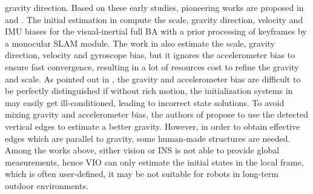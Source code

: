 \documentclass[journal,article,submit,moreauthors,pdftex]{Definitions/mdpi}
\begin{document}
gravity direction. Based on these early studies, pioneering works are proposed in \cite{mur-artalVisualInertialMonocularSLAM2017a} and \cite{qinRobustInitializationMonocular2017}. The initial estimation in \cite{mur-artalVisualInertialMonocularSLAM2017a} compute the scale, gravity direction, velocity and IMU biases for the visual-inertial full BA with a prior processing of keyframes by a monocular SLAM module. The work in \cite{qinRobustInitializationMonocular2017} also estimate the scale, gravity direction, velocity and gyroscope bias, but it ignores the accelerometer bias to ensure fast convergence, resulting in a lot of resources cost to refine the gravity and scale. As pointed out in \cite{martinelliClosedFormSolutionVisualInertial2014}, the gravity and accelerometer bias are difficult to be perfectly distinguished if without rich motion, the initialization systems in \cite{mur-artalVisualInertialMonocularSLAM2017a,qinRobustInitializationMonocular2017} may easily get ill-conditioned, leading to incorrect state solutions. To avoid mixing gravity and accelerometer bias, the authors of \cite{liRapidRobustMonocular2019} propose to use the detected vertical edges to estimate a better gravity. However, in order to obtain effective edges which are parallel to gravity, some human-made structures are needed. Among the works above, either vision or INS is not able to provide global measurements, hence VIO can only estimate the initial states in the local frame, which is often user-defined, it may be not suitable for robots in  long-term outdoor environments.
\end{document}
